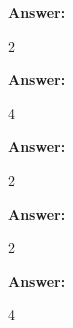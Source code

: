 \documentclass[12pt,twoside]{article}
\newcommand{\answer}{
 \par\medskip
 \textbf{Answer:}
}
\newcommand{\answerIf}{ \answer
2
}
\newcommand{\answerIg}{ \answer
4
}
\newcommand{\answerIh}{ \answer
2
}
\newcommand{\answerIi}{ \answer
2
}
\newcommand{\answerIj}{ \answer
4
}
\begin{document}
\begin{problems}
\begin{problemparts}
\begin{problemparts}
\answerIf

\answerIg

\answerIh

\answerIi

\answerIj


\end{problemparts}
\end{problemparts}
\end{problems}
\end{document}
